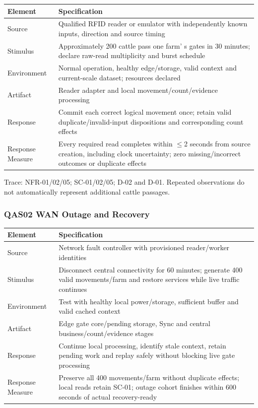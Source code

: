 {\small
\begin{longtable}[]{|>{\raggedright\arraybackslash}p{}|>{\raggedright\arraybackslash}p{}|}
\hline
\textbf{Element} & \textbf{Specification} \\ \hline
\endhead
Source & Qualified RFID reader or emulator with independently known
inputs, direction and source timing \\ \hline
Stimulus & Approximately 200 cattle pass one farm' s
gates in 30 minutes; declare raw-read multiplicity and burst schedule \\ \hline
Environment & Normal operation, healthy edge/storage, valid context and
current-scale dataset; resources declared \\ \hline
Artifact & Reader adapter and local movement/count/evidence
processing \\ \hline
Response & Commit each correct logical movement once; retain valid
duplicate/invalid-input dispositions and corresponding count effects \\ \hline
Response Measure & Every required read completes within \(\leq\)2
seconds from source creation, including clock uncertainty; zero
missing/incorrect outcomes or duplicate effects \\ \hline
\end{longtable}
}

Trace: NFR-01/02/05; SC-01/02/05; D-02 and D-01. Repeated observations
do not automatically represent additional cattle passages.

\subsubsection{QAS02 WAN Outage and Recovery}\label{sec:3.4.2}

{\small
\begin{longtable}[]{|>{\raggedright\arraybackslash}p{}|>{\raggedright\arraybackslash}p{}|}
\hline
\textbf{Element} & \textbf{Specification} \\ \hline
\endhead
Source & Network fault controller with provisioned reader/worker
identities \\ \hline
Stimulus & Disconnect central connectivity for 60 minutes; generate 400
valid movements/farm and restore services while live traffic
continues \\ \hline
Environment & Test with healthy local power/storage, sufficient
buffer and valid cached context \\ \hline
Artifact & Edge gate core/pending storage, Sync and central
business/count/evidence stages \\ \hline
Response & Continue local processing, identify stale context, retain
pending work and replay safely without blocking live gate processing \\ \hline
Response Measure & Preserve all 400 movements/farm without duplicate
effects; local reads retain SC-01; outage cohort finishes within 600
seconds of actual recovery-ready \\ \hline
\end{longtable}
}

